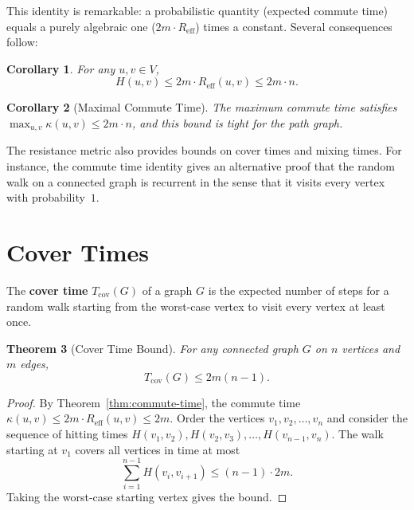\documentclass[twoside,12pt]{book}
\theoremstyle{plain}
\newtheorem{theorem}{Theorem}[chapter]
\newtheorem{corollary}[theorem]{Corollary}
\theoremstyle{definition}
\theoremstyle{remark}
\begin{document}
This identity is remarkable: a probabilistic quantity (expected commute
time) equals a purely algebraic one ($2m \cdot R_{\mathrm{eff}}$) times a
constant. Several consequences follow:

\begin{corollary}\label{cor:hitting-upper}
For any $u, v \in V$,
\[
    H(u,v) \leq 2m \cdot R_{\mathrm{eff}}(u,v) \leq 2m \cdot n.
\]
\end{corollary}

\begin{corollary}[Maximal Commute Time]\label{cor:max-commute}
The maximum commute time satisfies $\max_{u,v} \kappa(u,v) \leq 2m \cdot n$,
and this bound is tight for the path graph.
\end{corollary}

The resistance metric also provides bounds on cover times and mixing times.
For instance, the commute time identity gives an alternative proof that the
random walk on a connected graph is recurrent in the sense that it visits
every vertex with probability~$1$.

\section{Cover Times}
\label{sec:cover-times}

The \textbf{cover time} $T_{\mathrm{cov}}(G)$ of a graph $G$ is the
expected number of steps for a random walk starting from the worst-case
vertex to visit every vertex at least once.

\begin{theorem}[Cover Time Bound]\label{thm:cover-time}
For any connected graph $G$ on $n$ vertices and $m$ edges,
\[
    T_{\mathrm{cov}}(G) \leq 2m(n - 1).
\]
\end{theorem}

\begin{proof}
By Theorem~\ref{thm:commute-time}, the commute time $\kappa(u,v) \leq
2m \cdot R_{\mathrm{eff}}(u,v) \leq 2m$. Order the vertices
$v_1, v_2, \ldots, v_n$ and consider the sequence of hitting times
$H(v_1, v_2), H(v_2, v_3), \ldots, H(v_{n-1}, v_n)$. The walk starting
at $v_1$ covers all vertices in time at most
\[
    \sum_{i=1}^{n-1} H(v_i, v_{i+1}) \leq (n-1) \cdot 2m.
\]
Taking the worst-case starting vertex gives the bound.
\end{proof}
\end{document}
